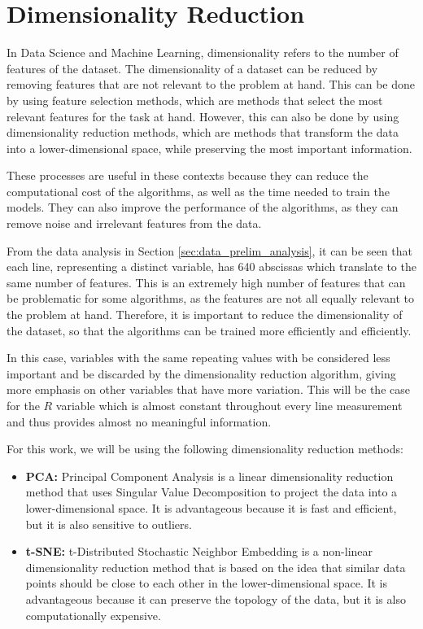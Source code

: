 \section{Dimensionality Reduction}\label{sec:dim_reduction}
In Data Science and Machine Learning, dimensionality refers to the number of features of the dataset. The dimensionality of a dataset can be reduced by removing features that are not relevant to the problem at hand. This can be done by using feature selection methods, which are methods that select the most relevant features for the task at hand. However, this can also be done by using dimensionality reduction methods, which are methods that transform the data into a lower-dimensional space, while preserving the most important information.

These processes are useful in these contexts because they can reduce the computational cost of the algorithms, as well as the time needed to train the models. They can also improve the performance of the algorithms, as they can remove noise and irrelevant features from the data.

From the data analysis in Section \ref{sec:data_prelim_analysis}, it can be seen that each line, representing a distinct variable, has 640 abscissas which translate to the same number of features. This is an extremely high number of features that can be problematic for some algorithms, as the features are not all equally relevant to the problem at hand. Therefore, it is important to reduce the dimensionality of the dataset, so that the algorithms can be trained more efficiently and efficiently. 

In this case, variables with the same repeating values with be considered less important and be discarded by the dimensionality reduction algorithm, giving more emphasis on other variables that have more variation. This will be the case for the $R$ variable which is almost constant throughout every line measurement and thus provides almost no meaningful information.

For this work, we will be using the following dimensionality reduction methods:

\begin{itemize}
    \item \textbf{PCA:} Principal Component Analysis is a linear dimensionality reduction method that uses Singular Value Decomposition to project the data into a lower-dimensional space. It is advantageous because it is fast and efficient, but it is also sensitive to outliers.
    \item \textbf{t-SNE:} t-Distributed Stochastic Neighbor Embedding is a non-linear dimensionality reduction method that is based on the idea that similar data points should be close to each other in the lower-dimensional space. It is advantageous because it can preserve the topology of the data, but it is also computationally expensive.
\end{itemize}

